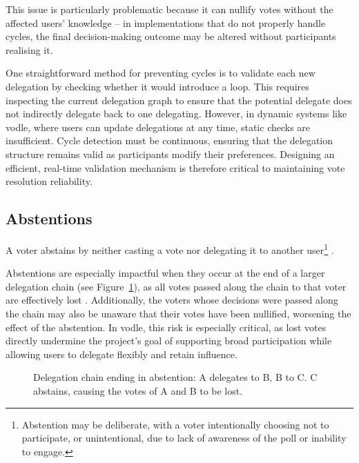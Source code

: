 This issue is particularly problematic because it can nullify votes without the affected users' knowledge -- in implementations that do not properly handle cycles, the final decision-making outcome may be altered without participants realising it.

One straightforward method for preventing cycles is to validate each new delegation by checking whether it would introduce a loop. This requires inspecting the current delegation graph to ensure that the potential delegate does not indirectly delegate back to one delegating. However, in dynamic systems like vodle, where users can update delegations at any time, static checks are insufficient. Cycle detection must be continuous, ensuring that the delegation structure remains valid as participants modify their preferences. Designing an efficient, real-time validation mechanism is therefore critical to maintaining vote resolution reliability.

\subsection*{Abstentions}

A voter abstains by neither casting a vote nor delegating it to another user\footnote{Abstention may be deliberate, with a voter intentionally choosing not to participate, or unintentional, due to lack of awareness of the poll or inability to engage.} \citep{brill_liquid_2022}.

Abstentions are especially impactful when they occur at the end of a larger delegation chain (see Figure~\ref{fig:delegation-abstention}), as all votes passed along the chain to that voter are effectively lost \citep{brill_liquid_2022}. Additionally, the voters whose decisions were passed along the chain may also be unaware that their votes have been nullified, worsening the effect of the abstention. In vodle, this risk is especially critical, as lost votes directly undermine the project's goal of supporting broad participation while allowing users to delegate flexibly and retain influence.

\begin{figure}[H]
  \centering
  \caption{Delegation chain ending in abstention: A delegates to B, B to C. C abstains, causing the votes of A and B to be lost.}
  \label{fig:delegation-abstention}
\end{figure}


